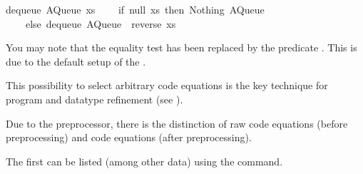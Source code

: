\begin{isabellebody}
\begin{isamarkuptext}
dequeue\ {\isacharparenleft}AQueue\ xs\ {\isacharbrackleft}{\isacharbrackright}{\isacharparenright}\ {\isacharequal}\isanewline
\ \ {\isacharparenleft}if\ null\ xs\ then\ {\isacharparenleft}Nothing{\isacharcomma}\ AQueue\ {\isacharbrackleft}{\isacharbrackright}\ {\isacharbrackleft}{\isacharbrackright}{\isacharparenright}\isanewline
\ \ \ \ else\ dequeue\ {\isacharparenleft}AQueue\ {\isacharbrackleft}{\isacharbrackright}\ {\isacharparenleft}reverse\ xs{\isacharparenright}{\isacharparenright}{\isacharparenright}{\isacharsemicolon}\isanewline%
\end{isamarkuptext}%
\isamarkuptrue%
%
\endisatagtypewriter
{\isafoldtypewriter}%
%
\isadelimtypewriter
%
\endisadelimtypewriter
%
\begin{isamarkuptext}%
\noindent You may note that the equality test  has
  been replaced by the predicate .  This is due
  to the default setup of the .

  This possibility to select arbitrary code equations is the key
  technique for program and datatype refinement (see
  ).

  Due to the preprocessor, there is the distinction of raw code
  equations (before preprocessing) and code equations (after
  preprocessing).

  The first can be listed (among other data) using the \hypertarget{command.print-codesetup}{\hyperlink{command.print-codesetup}{\mbox{}}} command.


\end{isamarkuptext}
\end{isabellebody}
